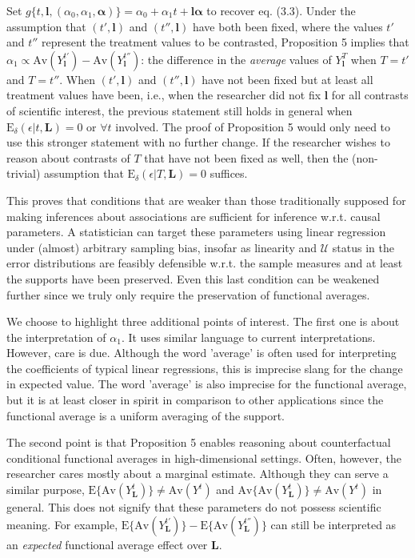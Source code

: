 \documentclass[12pt]{amsart}
\theoremstyle{plain}%
\theoremstyle{definition}
\theoremstyle{remark}
\numberwithin{equation}{section}
\begin{document}
Set $g\{ t, \mathbf{l}, (\alpha_0, \alpha_1, \boldsymbol{\alpha}) \} = \alpha_0 + \alpha_1 t + \mathbf{l} \boldsymbol{\alpha}$ to recover eq. (3.3). Under the assumption that $(t', \mathbf{l})$ and $(t'', \mathbf{l})$ have both been fixed, where the values $t'$ and $t''$ represent the treatment values to be contrasted, Proposition 5 implies that $\alpha_1 \propto  \text{Av}(Y_{\mathbf{l}}^{t'}) -  \text{Av}(Y_{\mathbf{l}}^{t''})$: the difference in the \textit{average} values of $Y_{\mathbf{l}}^{T}$ when $T=t'$ and $T=t''$. When $(t', \mathbf{l})$ and $(t'', \mathbf{l})$ have not been fixed but at least all treatment values have been, i.e., when the researcher did not fix $\mathbf{l}$ for all contrasts of scientific interest, the previous statement still holds in general when $\text{E}_{\delta}(\epsilon | t, \mathbf{L}) = 0$ or $\forall t$ involved. The proof of Proposition 5 would only need to use this stronger statement with no further change. If the researcher wishes to reason about contrasts of $T$ that have not been fixed as well, then the (non-trivial) assumption that $\text{E}_{\delta}(\epsilon | T, \mathbf{L}) = 0$ suffices.

This proves that conditions that are weaker than those traditionally supposed for making inferences about associations are sufficient for inference w.r.t. causal parameters. A statistician can target these parameters using linear regression under (almost) arbitrary sampling bias, insofar as linearity and $\mathcal{U}$ status in the error distributions are feasibly defensible w.r.t. the sample measures and at least the supports have been preserved. Even this last condition can be weakened further since we truly only require the preservation of functional averages.

We choose to highlight three additional points of interest. The first one is about the interpretation of $\alpha_1$. It uses similar language to current interpretations. However, care is due. Although the word 'average' is often used for interpreting the coefficients of typical linear regressions, this is imprecise slang for the change in expected value. The word 'average' is also imprecise for the functional average, but it is at least closer in spirit in comparison to other applications since the functional average is a uniform averaging of the support.

The second point is that Proposition 5 enables reasoning about counterfactual conditional functional averages in high-dimensional settings. Often, however, the researcher cares mostly about a marginal estimate. Although they can serve a similar purpose, $\text{E} \{ \text{Av}(Y_{\mathbf{L}}^t) \} \neq \text{Av}(Y^t)$ and $\text{Av} \{ \text{Av}(Y_{\mathbf{L}}^t) \} \neq \text{Av}(Y^t)$ in general. This does not signify that these parameters do not possess scientific meaning. For example, $\text{E} \{ \text{Av}(Y_{\mathbf{L}}^{t'}) \} - \text{E} \{ \text{Av}(Y_{\mathbf{L}}^{t''}) \}$ can still be interpreted as an \textit{expected} functional average effect over $\mathbf{L}$.
\end{document}
